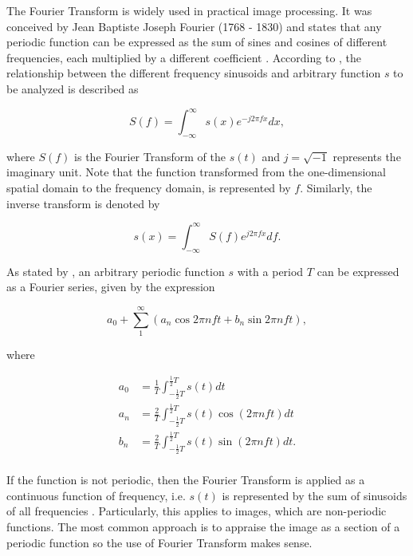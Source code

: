 The Fourier Transform is widely used in practical image processing. It was conceived by Jean Baptiste Joseph Fourier (1768 - 1830) and states that any periodic function can be expressed as the sum of sines and cosines of different frequencies, each multiplied by a different coefficient \cite{gonzalez2018digital}. According to , the relationship between the different frequency sinusoids and arbitrary function $s$ to be analyzed is described as

\begin{equation}
\label{eqn:fourier_transform}
S(f) = \int_{-\infty}^{\infty}s(x)e^{-j 2 \pi f x} dx,
\end{equation}

\noindent where $S(f)$ is the Fourier Transform of the $s(t)$ and $j = \sqrt{-1}$ represents the imaginary unit. Note that the function transformed from the one-dimensional spatial domain to the frequency domain, is represented by $f$. Similarly, the inverse transform is denoted by

\begin{equation}
\label{eqn:inverse_fourier_transform}
s(x) = \int_{-\infty}^{\infty}S(f)e^{j 2 \pi f x} df.
\end{equation}

As stated by , an arbitrary periodic function $s$ with a period $T$ can be expressed as a Fourier series, given by the expression

\begin{equation}
\label{eqn:fourier_series}
a_{0} + \sum_{1}^{\infty} (a_{n} \cos{2 \pi n f t} + b_{n} \sin{2 \pi n f t}),
\end{equation}

\noindent where

\begin{align*}
a_{0} &= \frac{1}{T} \int_{-\frac{1}{2} T}^{\frac{1}{2} T} s(t) dt\\
a_{n} &= \frac{2}{T} \int_{-\frac{1}{2} T}^{\frac{1}{2} T} s(t) \cos{(2 \pi n f t)} dt\\
b_{n} &= \frac{2}{T} \int_{-\frac{1}{2} T}^{\frac{1}{2} T} s(t) \sin{(2 \pi n f t)} dt.\\
\end{align*}

If the function is not periodic, then the Fourier Transform is applied as a continuous function of frequency, i.e. $s(t)$ is represented by the sum of sinusoids of all frequencies \cite{brigham1988fast}. Particularly, this applies to images, which are non-periodic functions. The most common approach is to appraise the image as a section of a periodic function so the use of Fourier Transform makes sense.

